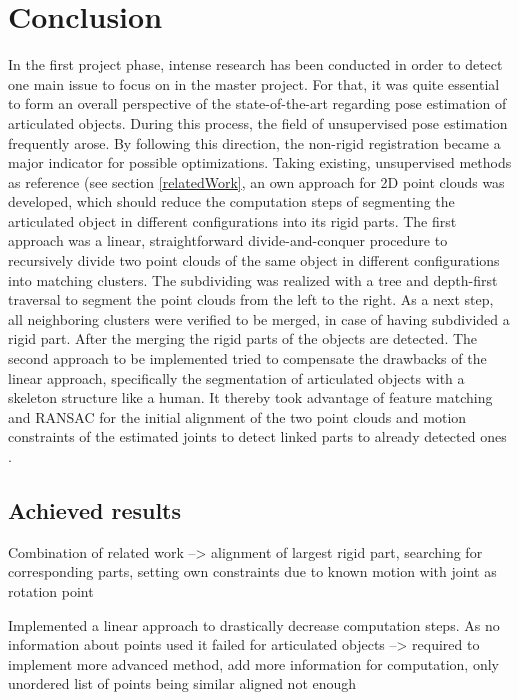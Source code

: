 \chapter{Conclusion}
\label{cha:Closing}

In the first project phase, intense research has been conducted in order to detect one main issue to focus on in the master project. For that, it was quite essential to form an overall perspective of the state-of-the-art regarding pose estimation of articulated objects. During this process, the field of unsupervised pose estimation frequently arose. By following this direction, the non-rigid registration became a major indicator for possible optimizations. Taking existing, unsupervised methods as reference (see section \ref{relatedWork}, an own approach for 2D point clouds was developed, which should reduce the computation steps of segmenting the articulated object in different configurations into its rigid parts. The first approach was a linear, straightforward  divide-and-conquer procedure to recursively divide two point clouds of the same object in different configurations into matching clusters. The subdividing was realized with a tree and depth-first traversal to segment the point clouds from the left to the right. As a next step, all neighboring clusters were verified to be merged, in case of having subdivided a rigid part. After the merging the rigid parts of the objects are detected. The second approach to be implemented tried to compensate the drawbacks of the linear approach, specifically the segmentation of articulated objects with a skeleton structure like a human. It thereby took advantage of feature matching and RANSAC for the initial alignment of the two point clouds and motion constraints of the estimated joints to detect linked parts to already detected ones \cite{guo2016correspondence}.

\section{Achieved results}

Combination of related work --> alignment of largest rigid part, searching for corresponding parts, setting own constraints due to known motion with joint as rotation point

Implemented a linear approach to drastically decrease computation steps. As no information about points used it failed for articulated objects --> required to implement more advanced method, add more information for computation, only unordered list of points being similar aligned not enough

